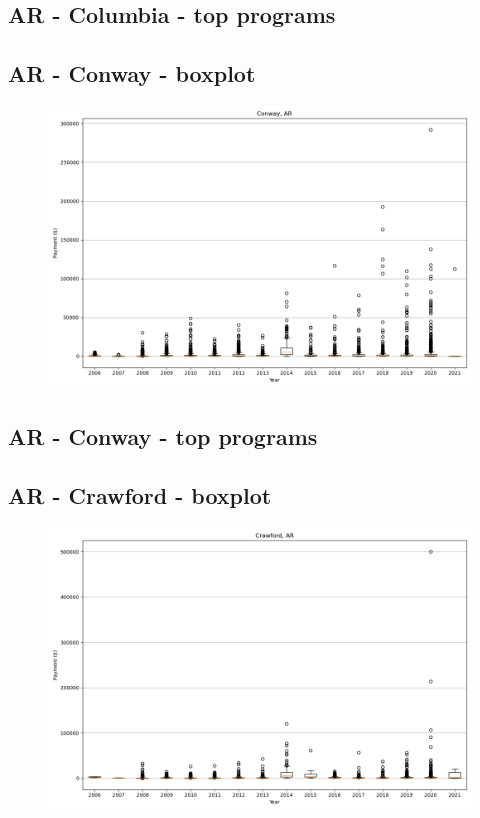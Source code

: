 \subsection*{AR - Columbia - top programs}

\newpage
\subsection*{AR - Conway - boxplot}
\begin{figure}[h]
\centering
\includegraphics[width=7in]{../output/boxplots/counties/Conway-AR_boxplot.png}
\end{figure}


\subsection*{AR - Conway - top programs}

\newpage
\subsection*{AR - Crawford - boxplot}
\begin{figure}[h]
\centering
\includegraphics[width=7in]{../output/boxplots/counties/Crawford-AR_boxplot.png}
\end{figure}


